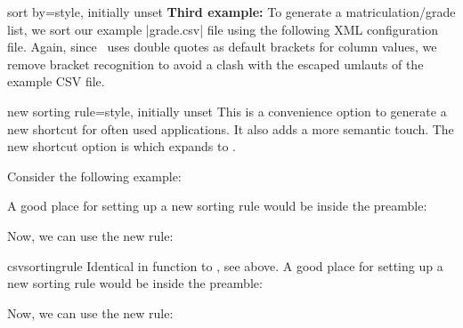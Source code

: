 \documentclass[a4paper,11pt]{ltxdoc}
\begin{document}
\begin{docCsvKey}{sort by}{=}{style, initially unset}
\clearpage\textbf{Third example:}
  To generate a matriculation/grade list, we sort our example |grade.csv| file
  using the following XML configuration file.
  Again, since \csvsorter\ uses double quotes
  as default brackets for column values, we remove bracket recognition to avoid
  a clash with the escaped umlauts of the example CSV file.\par\smallskip

\begin{dispExample}
\end{dispExample}
\end{docCsvKey}


\clearpage
\begin{docCsvKey}{new sorting rule}{=}{style, initially unset}
This is a convenience option to generate a new shortcut for often used
 applications. It also adds a more semantic touch.
The new shortcut option is
 which expands to
.\par\medskip

Consider the following example:
\begin{dispExample}
\end{dispExample}
A good place for setting up a new sorting rule would be inside the preamble:

\begin{dispListing}
\end{dispListing}

Now, we can use the new rule:
\begin{dispExample}
\end{dispExample}
\end{docCsvKey}


\begin{docCommand}[doc new=2021-06-28]{csvsortingrule}{}
  Identical in function to , see above.
A good place for setting up a new sorting rule would be inside the preamble:

\begin{dispListing}
\end{dispListing}

Now, we can use the new rule:
\begin{dispExample}
\end{dispExample}
\end{docCommand}
\end{document}
